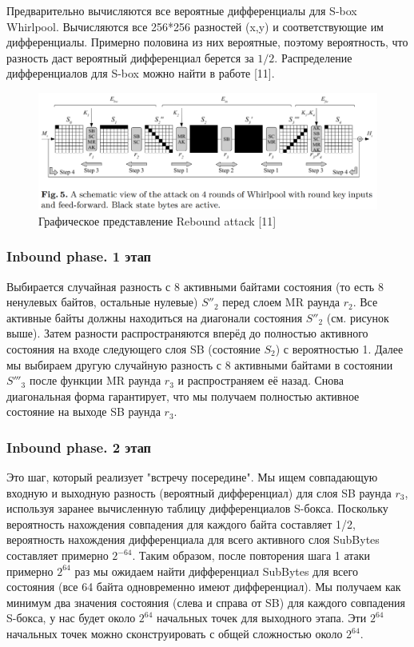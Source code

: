 \documentclass[colorthm]{./civarticle}
\begin{document}
Предварительно вычисляются все вероятные дифференциалы для S-box Whirlpool. Вычисляются все 256*256 разностей (x,y) и соответствующие им дифференциалы. Примерно половина из них вероятные, поэтому вероятность, что разность даст вероятный дифференциал берется за $1/2$. Распределение дифференциалов для S-box можно найти в работе [11].

\begin{figure}[H]
    \centering
    \includegraphics[width=0.75\linewidth]{rebound_view.png}
    \caption{Графическое представление Rebound attack [11]}
    \label{fig:enter-label}
\end{figure}

\subsubsection{Inbound phase. 1 этап}

Выбирается случайная разность с 8 активными байтами состояния (то есть 8 ненулевых байтов, остальные нулевые) $S''_2$ перед слоем MR раунда $r_2$. Все активные байты должны находиться на диагонали состояния $S''_2$ (см. рисунок выше). Затем разности распространяются вперёд до полностью активного состояния на входе следующего слоя SB (состояние $S_2$) с вероятностью 1. Далее мы выбираем другую случайную разность с 8 активными байтами в состоянии $S'''_3$ после функции MR раунда $r_3$ и распространяем её назад. Снова диагональная форма гарантирует, что мы получаем полностью активное состояние на выходе SB раунда $r_3$.

\subsubsection{Inbound phase. 2 этап}

Это шаг, который реализует "встречу посередине". Мы ищем совпадающую входную и выходную разность (вероятный дифференциал) для слоя SB раунда $r_3$, используя заранее вычисленную таблицу дифференциалов S-бокса. Поскольку вероятность нахождения совпадения для каждого байта составляет 1/2, вероятность нахождения дифференциала для всего активного слоя SubBytes составляет примерно $2^{-64}$. Таким образом, после повторения шага 1 атаки примерно $2^{64}$ раз мы ожидаем найти дифференциал SubBytes для всего состояния (все 64 байта одновременно имеют дифференциал). Мы получаем как минимум два значения состояния (слева и справа от SB) для каждого совпадения S-бокса, у нас будет около $2^{64}$ начальных точек для выходного этапа. Эти $2^{64}$ начальных точек можно сконструировать с общей сложностью около $2^{64}$.
\end{document}
